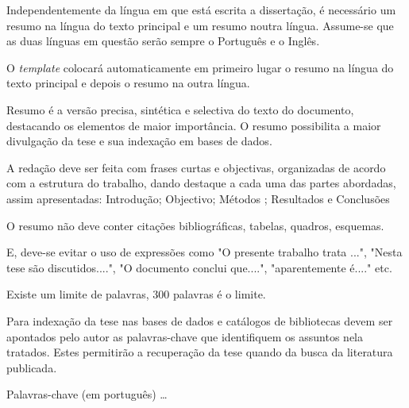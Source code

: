 \abstractPT  %

Independentemente da língua em que está escrita a dissertação, é necessário um resumo na língua do texto principal e um resumo noutra língua. Assume-se que as duas línguas em questão serão sempre o Português e o Inglês.

O \emph{template} colocará automaticamente em primeiro lugar o resumo na língua do texto principal e depois o resumo na outra língua.

Resumo é a versão precisa, sintética e selectiva do texto do documento, destacando os elementos de maior importância. O resumo possibilita a maior divulgação da tese e sua indexação em bases de dados.

A redação deve ser feita com frases curtas e objectivas, organizadas de acordo com a estrutura do trabalho, dando destaque a cada uma das partes abordadas, assim apresentadas: Introdução; Objectivo; Métodos ; Resultados e Conclusões

O resumo não deve conter citações bibliográficas, tabelas, quadros, esquemas.

E, deve-se evitar o uso de expressões como "O presente trabalho trata ...", "Nesta tese são discutidos....", "O documento conclui que....", "aparentemente é...." etc.

Existe um limite de palavras, 300 palavras é o limite.

Para indexação da tese nas bases de dados e catálogos de bibliotecas devem ser apontados pelo autor as palavras-chave que identifiquem os assuntos nela tratados. Estes permitirão a recuperação da tese quando da busca da literatura publicada.

\begin{keywords}
    Palavras-chave (em português) \ldots
\end{keywords}

